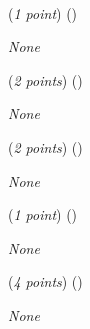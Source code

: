 \documentclass{template}
\begin{document}
\newpage

\begin{problem}
~\newline
~\newline


\begin{subproblem}
(\textit{1 point}) (\scorecodeemoji{})


\end{subproblem}

\begin{solution}
\textit{None}
\end{solution}

\begin{subproblem}
(\textit{2 points}) (\scorecodeemoji{})


\end{subproblem}

\begin{solution}
\textit{None}
\end{solution}

\begin{subproblem}
(\textit{2 points}) (\scorecodeemoji{})


\end{subproblem}

\begin{solution}
\textit{None}
\end{solution}

\begin{subproblem}
(\textit{1 point}) (\scorecodeemoji{})


\end{subproblem}

\begin{solution}
\textit{None}
\end{solution}

\begin{subproblem}
(\textit{4 points}) (\scorecodeemoji{})


\end{subproblem}

\begin{solution}
\textit{None}
\end{solution}
\end{problem}

\newpage
\end{document}
